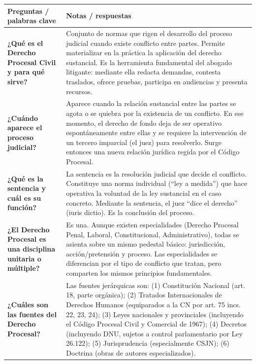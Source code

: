 \documentclass[12pt,oneside]{book}
\begin{document}
\begin{table}[H]
\centering
\begin{tabularx}{\textwidth}{
    >{\raggedright\arraybackslash}p{}
    >{\raggedright\arraybackslash}X
}
\toprule
\textbf{Preguntas / palabras clave} &
\textbf{Notas / respuestas} \\
\midrule

\textbf{¿Qué es el Derecho Procesal Civil y para qué sirve?} &
Conjunto de normas que rigen el desarrollo del proceso judicial cuando existe conflicto entre partes. Permite materializar en la práctica la aplicación del derecho sustancial. Es la herramienta fundamental del abogado litigante: mediante ella redacta demandas, contesta traslados, ofrece pruebas, participa en audiencias y presenta recursos. \\

\textbf{¿Cuándo aparece el proceso judicial?} &
Aparece cuando la relación sustancial entre las partes se agota o se quiebra por la existencia de un conflicto. En ese momento, el derecho de fondo deja de ser operativo espontáneamente entre ellas y se requiere la intervención de un tercero imparcial (el juez) para resolverlo. Surge entonces una nueva relación jurídica regida por el Código Procesal. \\

\textbf{¿Qué es la sentencia y cuál es su función?} &
La sentencia es la resolución judicial que decide el conflicto. Constituye una norma individual (``ley a medida'') que hace operativa la voluntad de la ley sustancial en el caso concreto. Mediante la sentencia, el juez ``dice el derecho'' (iuris dictio). Es la conclusión del proceso. \\

\textbf{¿El Derecho Procesal es una disciplina unitaria o múltiple?} &
Es una. Aunque existen especialidades (Derecho Procesal Penal, Laboral, Constitucional, Administrativo), todas se asienta sobre un mismo pedestal básico: jurisdicción, acción/pretensión y proceso. Las especialidades se diferencian por el tipo de conflicto que tratan, pero comparten los mismos principios fundamentales. \\

\textbf{¿Cuáles son las fuentes del Derecho Procesal?} &
Las fuentes jerárquicas son: (1) Constitución Nacional (art. 18, parte orgánica); (2) Tratados Internacionales de Derechos Humanos (equiparados a la CN por art. 75 incs. 22, 23, 24); (3) Leyes nacionales y provinciales (incluyendo el Código Procesal Civil y Comercial de 1967); (4) Decretos (incluyendo DNU, sujetos a control parlamentario por Ley 26.122); (5) Jurisprudencia (especialmente CSJN); (6) Doctrina (obras de autores especializados). \\


\end{tabularx}
\end{table}
\end{document}
